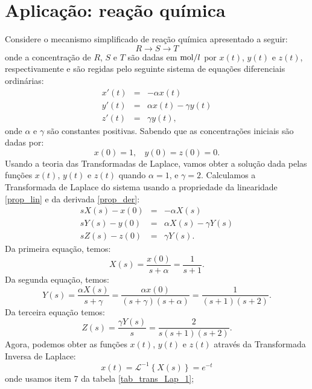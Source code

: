 \section{Aplicação: reação química}
Considere o mecanismo simplificado de reação química apresentado a seguir:
\begin{equation}R\longrightarrow S \longrightarrow T\end{equation}
onde a concentração de $R$, $S$ e $T$ são dadas em $\hbox{mol}/l$ por $x(t)$, $y(t)$ e $z(t)$, respectivamente e são regidas pelo seguinte sistema de equações diferenciais ordinárias:
\begin{eqnarray*}
x'(t)&=&-\alpha x(t) \\
y'(t)&=&\alpha x(t)-\gamma y(t)\\
z'(t)&=&\gamma y(t),
\end{eqnarray*} 
onde $\alpha$ e $\gamma$ são constantes positivas. Sabendo que as concentrações iniciais são dadas por:
\begin{equation}x(0)=1,~~~~ y(0)=z(0)=0.\end{equation}
Usando a teoria das Transformadas de Laplace, vamos obter a solução dada pelas funções $x(t)$, $y(t)$ e $z(t)$ quando $\alpha=1$, e $\gamma=2$. Calculamos a Transformada de Laplace do sistema usando a propriedade da linearidade \ref{prop_lin} e da derivada \ref{prop_der}:
\begin{eqnarray*}
sX(s)-x(0)&=&-\alpha X(s) \\
sY(s)-y(0)&=&\alpha X(s)-\gamma Y(s)\\
sZ(s)-z(0)&=&\gamma Y(s).
\end{eqnarray*} 
Da primeira equação, temos:
\begin{equation}
\label{eqX}X(s)=\frac{x(0)}{s+\alpha}=\frac{1}{s+1}.
\end{equation}
Da segunda equação, temos:
\begin{equation}
Y(s)=\frac{\alpha X(s)}{s+\gamma}=\frac{\alpha x(0) }{(s+\gamma)(s+\alpha)}=\frac{1}{(s+1)(s+2)}.
\end{equation}
Da terceira equação temos:
\begin{equation}
Z(s)=\frac{\gamma Y(s)}{s}=\frac{2}{s(s+1)(s+2)}.
\end{equation}
Agora, podemos obter as funções $x(t)$, $y(t)$ e $z(t)$ através da Transformada Inversa de Laplace:
\begin{equation}
x(t)=\mathcal{L}^{-1}\left\{X(s)\right\}=e^{-t}
\end{equation}
onde usamos item 7 da tabela \ref{tab_trans_Lap_1};
